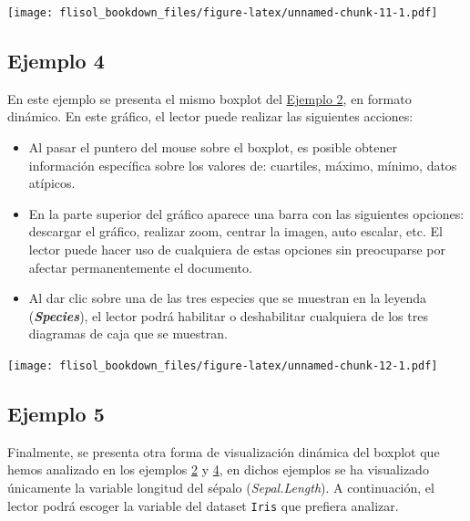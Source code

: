 \documentclass[
]{book}
\newenvironment{Shaded}{\begin{snugshade}}{\end{snugshade}}
\newcommand{\DataTypeTok}[1]{\textcolor[rgb]{0.13,0.29,0.53}{#1}}
\newcommand{\KeywordTok}[1]{\textcolor[rgb]{0.13,0.29,0.53}{\textbf{#1}}}
\newcommand{\NormalTok}[1]{#1}
\newcommand{\OperatorTok}[1]{\textcolor[rgb]{0.81,0.36,0.00}{\textbf{#1}}}
\newcommand{\StringTok}[1]{\textcolor[rgb]{0.31,0.60,0.02}{#1}}
\providecommand{\tightlist}{%
  \setlength{\itemsep}{0pt}\setlength{\parskip}{0pt}}
\begin{document}
\texttt{[image: flisol\_bookdown\_files/figure-latex/unnamed-chunk-11-1.pdf]}

\hypertarget{ejm4}{%
\subsection{Ejemplo 4}\label{ejm4}}

En este ejemplo se presenta el mismo boxplot del \protect\hyperlink{ejm2}{Ejemplo 2}, en formato dinámico. En este gráfico, el lector puede realizar las siguientes acciones:

\begin{itemize}
\tightlist
\item
  Al pasar el puntero del mouse sobre el boxplot, es posible obtener información específica sobre los valores de: cuartiles, máximo, mínimo, datos atípicos.
\item
  En la parte superior del gráfico aparece una barra con las siguientes opciones: descargar el gráfico, realizar zoom, centrar la imagen, auto escalar, etc. El lector puede hacer uso de cualquiera de estas opciones sin preocuparse por afectar permanentemente el documento.
\item
  Al dar clic sobre una de las tres especies que se muestran en la leyenda (\textbf{\emph{Species}}), el lector podrá habilitar o deshabilitar cualquiera de los tres diagramas de caja que se muestran.
\end{itemize}

\begin{Shaded}
\end{Shaded}

\texttt{[image: flisol\_bookdown\_files/figure-latex/unnamed-chunk-12-1.pdf]}

\hypertarget{ejemplo-5}{%
\subsection{Ejemplo 5}\label{ejemplo-5}}

Finalmente, se presenta otra forma de visualización dinámica del boxplot que hemos analizado en los ejemplos \protect\hyperlink{ejm2}{2} y \protect\hyperlink{ejm4}{4}, en dichos ejemplos se ha visualizado únicamente la variable longitud del sépalo (\emph{Sepal.Length}). A continuación, el lector podrá escoger la variable del dataset \texttt{Iris} que prefiera analizar.
\end{document}

